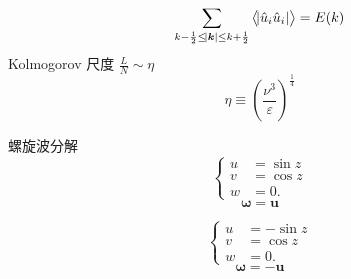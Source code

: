 \documentclass[12pt]{ctexart}
\begin{document}
\begin{equation}
   \sum_{k-\frac{1}{2}\le \abs{\bm{k} }\le k + \frac{1}{2}}^{} \left< \abs{ \hat{u}_i \hat{u}_i } \right> = E(k)
\end{equation}
Kolmogorov 尺度 $\frac{L}{N} \sim \eta$ 
\begin{equation}
   \eta \equiv \left( \frac{\nu^{3}}{\varepsilon} \right)^{\frac{1}{4}}
\end{equation}

螺旋波分解
\begin{equation}
   \left\{
	  \begin{aligned}
		 u & = \sin z \\
		 v & = \cos z \\
		 w & = 0.
	  \end{aligned}
   \right.
\end{equation}
\begin{equation}
   \bm{\omega}  = \bm{u} 
\end{equation}

\begin{equation}
   \left\{
	  \begin{aligned}
		 u & = -\sin z \\
		 v & = \cos z \\
		 w & = 0.
	  \end{aligned}
   \right.
\end{equation}
\begin{equation}
   \bm{\omega}  = - \bm{u} 
\end{equation}
\end{document}
